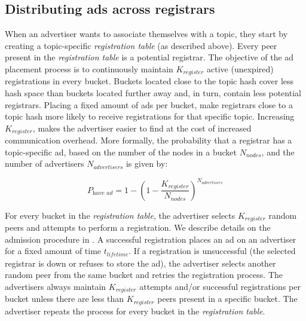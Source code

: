 
\subsection{Distributing ads across registrars}\label{sec:registration_multi}
When an advertiser wants to associate themselves with a topic, they start by creating a topic-specific \emph{registration table} (as described above). 
Every peer present in the \emph{registration table} is a potential registrar. 
The objective of the ad placement process is to continuously maintain $K_\textit{register}$ active (\ie unexpired) registrations in every bucket. 
Buckets located close to the topic hash cover less hash space than buckets located further away and, in turn, contain less potential registrars. 
Placing a fixed amount of ads per bucket, make registrars close to a topic hash more likely to receive registrations for that specific topic. 
Increasing $K_\textit{register}$, makes the advertiser easier to find at the cost of increased communication overhead. More formally, the probability that a registrar has a topic-specific ad, based on the number of the nodes in a bucket $N_\textit{nodes}$, and the number of advertisers $N_\textit{advertisers}$ is given by:

\begin{equation}
    P_\textit{have ad} = 1-(1 - \frac{K_\textit{register}}{N_\textit{nodes}})^{N_\textit{advertisers}}
\end{equation}

For every bucket in the \emph{registration table}, the advertiser selects
$K_{register}$ random peers and attempts to perform a registration.
We describe details on the admission procedure in . 
A successful registration places an ad on an advertiser for a fixed amount of time $t_\textit{lifetime}$.
If a registration is unsuccessful (the selected registrar is down or refuses to store the ad), the advertiser selects another random peer from the same bucket and retries the registration process. 
The advertisers always maintain $K_\textit{register}$ attempts and/or
successful registrations per bucket unless there are less than $K_\textit{register}$ peers present in a specific bucket.
The advertiser repeats the process for every bucket in the \emph{registration table}. 

